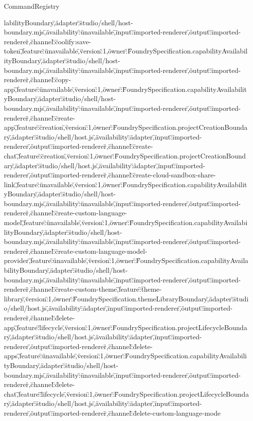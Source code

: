 \begin{lexlean}{CommandRegistry}
\begin{semanticmodule}
{labilityBoundary\",\"adapter\":\"studio/shell/host-boundary.mjs\",\"availability\":\"unavailable\",\"input\":\"imported-renderer\",\"output\":\"imported-renderer\"},{\"channel\":\"coolify:save-token\",\"feature\":\"unavailable\",\"version\":1,\"owner\":\"FoundrySpecification.capabilityAvailabilityBoundary\",\"adapter\":\"studio/shell/host-boundary.mjs\",\"availability\":\"unavailable\",\"input\":\"imported-renderer\",\"output\":\"imported-renderer\"},{\"channel\":\"copy-app\",\"feature\":\"unavailable\",\"version\":1,\"owner\":\"FoundrySpecification.capabilityAvailabilityBoundary\",\"adapter\":\"studio/shell/host-boundary.mjs\",\"availability\":\"unavailable\",\"input\":\"imported-renderer\",\"output\":\"imported-renderer\"},{\"channel\":\"create-app\",\"feature\":\"creation\",\"version\":1,\"owner\":\"FoundrySpecification.projectCreationBoundary\",\"adapter\":\"studio/shell/host.js\",\"availability\":\"adapter\",\"input\":\"imported-renderer\",\"output\":\"imported-renderer\"},{\"channel\":\"create-chat\",\"feature\":\"creation\",\"version\":1,\"owner\":\"FoundrySpecification.projectCreationBoundary\",\"adapter\":\"studio/shell/host.js\",\"availability\":\"adapter\",\"input\":\"imported-renderer\",\"output\":\"imported-renderer\"},{\"channel\":\"create-cloud-sandbox-share-link\",\"feature\":\"unavailable\",\"version\":1,\"owner\":\"FoundrySpecification.capabilityAvailabilityBoundary\",\"adapter\":\"studio/shell/host-boundary.mjs\",\"availability\":\"unavailable\",\"input\":\"imported-renderer\",\"output\":\"imported-renderer\"},{\"channel\":\"create-custom-language-model\",\"feature\":\"unavailable\",\"version\":1,\"owner\":\"FoundrySpecification.capabilityAvailabilityBoundary\",\"adapter\":\"studio/shell/host-boundary.mjs\",\"availability\":\"unavailable\",\"input\":\"imported-renderer\",\"output\":\"imported-renderer\"},{\"channel\":\"create-custom-language-model-provider\",\"feature\":\"unavailable\",\"version\":1,\"owner\":\"FoundrySpecification.capabilityAvailabilityBoundary\",\"adapter\":\"studio/shell/host-boundary.mjs\",\"availability\":\"unavailable\",\"input\":\"imported-renderer\",\"output\":\"imported-renderer\"},{\"channel\":\"create-custom-theme\",\"feature\":\"theme-library\",\"version\":1,\"owner\":\"FoundrySpecification.themeLibraryBoundary\",\"adapter\":\"studio/shell/host.js\",\"availability\":\"adapter\",\"input\":\"imported-renderer\",\"output\":\"imported-renderer\"},{\"channel\":\"delete-app\",\"feature\":\"lifecycle\",\"version\":1,\"owner\":\"FoundrySpecification.projectLifecycleBoundary\",\"adapter\":\"studio/shell/host.js\",\"availability\":\"adapter\",\"input\":\"imported-renderer\",\"output\":\"imported-renderer\"},{\"channel\":\"delete-apps\",\"feature\":\"unavailable\",\"version\":1,\"owner\":\"FoundrySpecification.capabilityAvailabilityBoundary\",\"adapter\":\"studio/shell/host-boundary.mjs\",\"availability\":\"unavailable\",\"input\":\"imported-renderer\",\"output\":\"imported-renderer\"},{\"channel\":\"delete-chat\",\"feature\":\"lifecycle\",\"version\":1,\"owner\":\"FoundrySpecification.projectLifecycleBoundary\",\"adapter\":\"studio/shell/host.js\",\"availability\":\"adapter\",\"input\":\"imported-renderer\",\"output\":\"imported-renderer\"},{\"channel\":\"delete-custom-language-mode}
\end{semanticmodule}
\end{lexlean}
